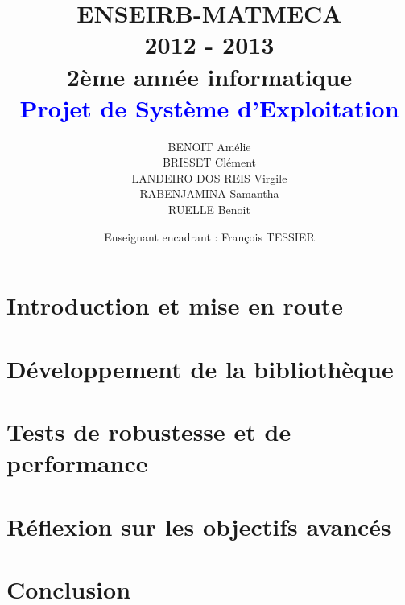 \documentclass[a4paper,12pt]{article}
\title{
	\normalsize{ENSEIRB-MATMECA \\ 
	2012 - 2013 \\
	2ème année informatique} \\
	\vspace{15mm}
	\Huge{\textcolor{blue}{Projet de Système d'Exploitation }}
}
\author{ BENOIT Amélie \\ BRISSET Clément \\ LANDEIRO DOS REIS Virgile \\ RABENJAMINA Samantha \\ RUELLE Benoit}
\date{
	\normalsize{Enseignant encadrant : François TESSIER}
}
\begin{document}
\maketitle

\clearpage

\section{Introduction et mise en route}


\section{Développement de la bibliothèque}


\section{Tests de robustesse et de performance}



\section{Réflexion sur les objectifs avancés}



\section{Conclusion}

\end{document}
